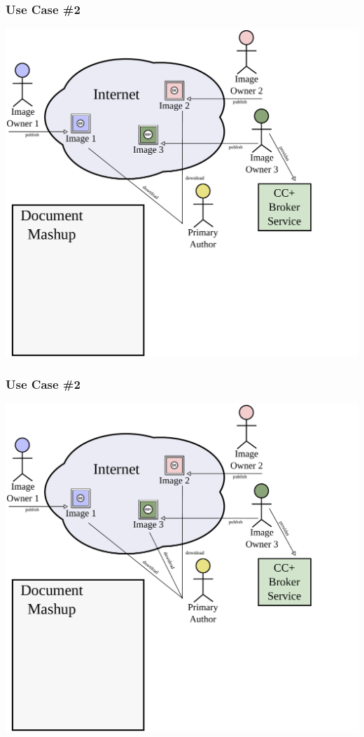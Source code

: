 \documentclass[mathserif,xcolor=dvipsnames,hyperref={bookmarks=true}]{beamer}
\begin{document}
    \begin{frame}[t]
        \frametitle{Use Case \#2}
        \begin{center}
            \includegraphics[width=0.9\textheight]{../resources/usecases/usecase2/usecase2-step16.pdf}
        \end{center}
    \end{frame}
    \begin{frame}[t]
        \frametitle{Use Case \#2}
        \begin{center}
            \includegraphics[width=0.9\textheight]{../resources/usecases/usecase2/usecase2-step17.pdf}
        \end{center}
    \end{frame}
\end{document}

